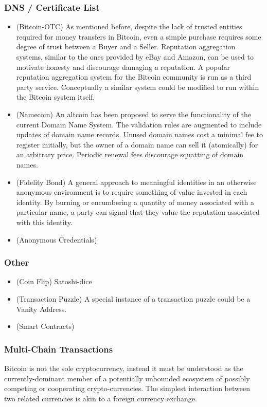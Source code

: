 \subsubsection{DNS / Certificate List}
\begin{itemize}
\item (Bitcoin-OTC) As mentioned before, despite the lack of trusted entities required for money transfers in Bitcoin, even a simple purchase requires some degree of trust between a Buyer and a Seller. Reputation aggregation systems, similar to the ones provided by eBay and Amazon, can be used to motivate honesty and discourage damaging a reputation. A popular reputation aggregation system for the Bitcoin community is run as a third party service. Conceptually a similar system could be modified to run within the Bitcoin system itself.
\item (Namecoin) An altcoin has been proposed to serve the functionality of the current Domain Name System. The validation rules are augmented to include updates of domain name records. Unused domain names cost a minimal fee to register initially, but the owner of a domain name can sell it (atomically) for an arbitrary price. Periodic renewal fees discourage squatting of domain names.
\item (Fidelity Bond) A general approach to meaningful identities in an otherwise anonymous environment is to require something of value invested in each identity. By burning or encumbering a quantity of money associated with a particular name, a party can signal that they value the reputation associated with this identity.
\item (Anonymous Credentials)
\end{itemize}

\subsubsection{Other}

\begin{itemize}
\item (Coin Flip) Satoshi-dice
\item (Transaction Puzzle) A special instance of a transaction puzzle could be a Vanity Address.
\item (Smart Contracts)
\end{itemize}

\subsubsection{Multi-Chain Transactions}
Bitcoin is not the sole cryptocurrency, instead it must be understood as the currently-dominant member of a potentially unbounded ecosystem of possibly competing or cooperating crypto-currencies. The simplest interaction between two related currencies is akin to a foreign currency exchange.

